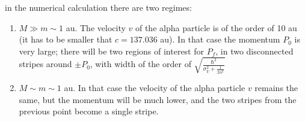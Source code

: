 \begin{importantbox}
  in the numerical calculation there are two regimes:
  \begin{enumerate}
    \item $M\gg m \sim 1$ au. The velocity $v$ of the alpha particle is of the order of 10 au (it has to be smaller that $c = 137.036$ au). In that case the momentum $P_0$ is very large; there will be two regions of interest for $P_f$, in two disconnected stripes around $\pm P_0$, with width of the order of $\sqrt{\frac{\hbar^2 }{\sigma_V^2 + \frac1{2\alpha^2}}}$

    \item $M\sim m\sim1$ au. In that case the velocity of the alpha particle $v$ remains the same, but the momentum will be much lower, and the two stripes from the previous point become a single stripe.
  \end{enumerate}
\end{importantbox}
